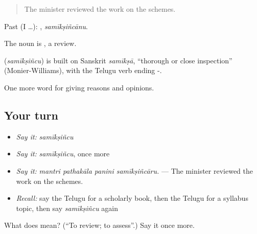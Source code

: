 \begin{quote}
The minister reviewed the work on the schemes.
\end{quote}

Past (I …): , \emph{samīkṣiñcānu}.

The noun is , a review.

\begin{cousinweb}
\textbf{} (\emph{samīkṣiñcu}) is built on Sanskrit \emph{samīkṣā}, \textquotedblleft{}thorough or close inspection\textquotedblright{} (Monier-Williams), with the Telugu verb ending -.
\end{cousinweb}

\begin{grammarlens}[title={What you've built}]
One more word for giving reasons and opinions.
\end{grammarlens}

\subsection*{Your turn}
\begin{itemize}
\raggedright
  \item \emph{Say it:} \emph{samīkṣiñcu}
  \item \emph{Say it:} \emph{samīkṣiñcu}, once more
  \item \emph{Say it:} \emph{mantri pathakāla panini samīkṣiñcāru.} — The minister reviewed the work on the schemes.
  \item \emph{Recall:} say the Telugu for a scholarly book, then the Telugu for a syllabus topic, then say \emph{samīkṣiñcu} again
\end{itemize}

\begin{tcolorbox}[breakable,colback=teal!4,colframe=teal!35!black,title={Before you move on}]
What does  mean? (\textquotedblleft{}To review; to assess\textquotedblright{}.) Say it once more.
\end{tcolorbox}
